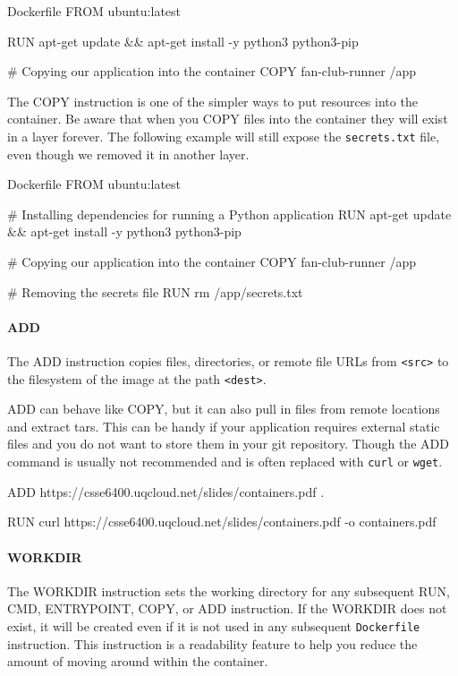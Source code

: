 \documentclass{csse4400}
\begin{document}
\begin{code}[language=docker,numbers=none]{Dockerfile}
FROM ubuntu:latest

RUN apt-get update && apt-get install -y python3 python3-pip

# Copying our application into the container
COPY fan-club-runner /app
\end{code}

The COPY instruction is one of the simpler ways to put resources into the container.
Be aware that when you COPY files into the container they will exist in a layer forever.
The following example will still expose the \texttt{secrets.txt} file, even though we removed it in another layer.

\begin{code}[language=docker,numbers=none]{Dockerfile}
FROM ubuntu:latest

# Installing dependencies for running a Python application
RUN apt-get update && apt-get install -y python3 python3-pip

# Copying our application into the container
COPY fan-club-runner /app

# Removing the secrets file
RUN rm /app/secrets.txt
\end{code}

\paragraph{ADD}
The ADD instruction copies files, directories, or remote file URLs from \texttt{<src>}
to the filesystem of the image at the path \texttt{<dest>}.

ADD can behave like COPY, but it can also pull in files from remote locations and extract tars.
This can be handy if your application requires external static files and you do not want to store them in your git repository.
Though the ADD command is usually not recommended and is often replaced with \texttt{curl} or \texttt{wget}.

\begin{code}[language=docker,numbers=none]{}
ADD https://csse6400.uqcloud.net/slides/containers.pdf .
\end{code}
\begin{code}[language=docker,numbers=none]{}
RUN curl https://csse6400.uqcloud.net/slides/containers.pdf -o containers.pdf
\end{code}

\paragraph{WORKDIR}
The WORKDIR instruction sets the working directory for any subsequent RUN, CMD, ENTRYPOINT, COPY, or ADD instruction.
If the WORKDIR does not exist, it will be created even if it is not used in any subsequent \texttt{Dockerfile} instruction.
This instruction is a readability feature to help you reduce the amount of moving around within the container.
\end{document}

